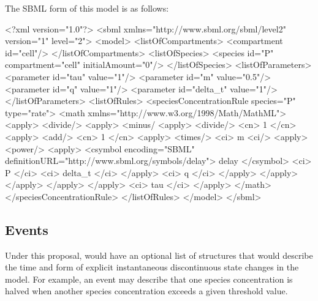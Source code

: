 \documentclass[10pt,twocolumntoc]{cekarticle}
\begin{document}
The SBML form of this model is as follows:
\begin{example}
<?xml version="1.0"?>
<sbml xmlns="http://www.sbml.org/sbml/level2" version="1" level="2">
    <model>
        <listOfCompartments>
            <compartment id="cell"/>
        </listOfCompartments>
        <listOfSpecies>
            <species id="P" compartment="cell" initialAmount="0"/>
        </listOfSpecies>
        <listOfParameters>
            <parameter id="tau" value="1"/>
            <parameter id="m" value="0.5"/>
            <parameter id="q" value="1"/>
            <parameter id="delta_t" value="1"/>
        </listOfParameters>
        <listOfRules>
            <speciesConcentrationRule species="P" type="rate">
                <math xmlns="http://www.w3.org/1998/Math/MathML">
                 <apply>
                  <divide/>
                  <apply>
                   <minus/
                   <apply>
                    <divide/>
                    <cn> 1 </cn>
                    <apply>
                     <add/>
                     <cn> 1 </cn>
                     <apply>
                      <times/>
                      <ci> m <ci/>
                      <apply>
                       <power/>
                       <apply>
                        <csymbol encoding="SBML"
                                 definitionURL="http://www.sbml.org/symbols/delay">
                            delay
                        </csymbol>
                        <ci> P </ci>
                        <ci> delta_t </ci>
                       </apply>
                       <ci> q </ci>
                      </apply>
                     </apply>
                    </apply>
                   </apply>
                  </apply>
                  <ci> tau </ci>
                 </apply>
                </math>
            </speciesConcentrationRule>
        </listOfRules>
    </model>
</sbml>
\end{example}

\subsection{Events}
\label{sec:events}

Under this proposal,  would have an optional list of
 structures that would describe the time and form of explicit
instantaneous discontinuous state changes in the model.  For example, an
event may describe that one species concentration is halved when another
species concentration exceeds a given threshold value.
\end{document}

